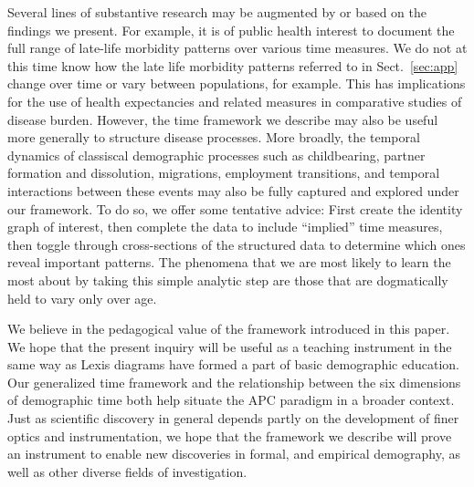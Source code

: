 \documentclass{bmcart}
\theoremstyle{definition}
\begin{document}
Several lines of substantive research may be augmented by or based on the
findings we present. For example, it is of public health interest to document
the full range of late-life morbidity patterns over various time measures. We do
not at this time know how the late life morbidity patterns referred to in
Sect.~\ref{sec:app} change over time or vary between populations, for example.
This has implications for the use of health expectancies and related measures in comparative studies of disease burden.
However, the time framework we describe may also be useful more generally to
structure disease processes. More broadly, the temporal dynamics of classiscal
demographic processes such as childbearing, partner formation and dissolution,
migrations, employment transitions, and temporal interactions between these events may also be fully captured and explored under our framework. To do so, we
offer some tentative advice: First create the identity graph of interest, then
complete the data to include ``implied'' time measures, then toggle through
cross-sections of the structured data to determine which ones reveal important patterns.
The phenomena that we are most likely to learn the most about by taking this
simple analytic step are those that are dogmatically held to vary only over age.

We believe in the pedagogical value of the framework
introduced in this paper. We hope that the
present inquiry will be useful as a teaching instrument in the same way as Lexis
diagrams have formed a part of basic demographic education.
Our generalized time framework and the relationship between the six dimensions
of demographic time both help situate the APC paradigm in a broader context.
Just as scientific discovery in general depends partly on the development of
finer optics and instrumentation, we hope that the framework we describe will prove an instrument to enable new discoveries in formal, and empirical demography, as well as other diverse fields of
investigation.


\end{document}
